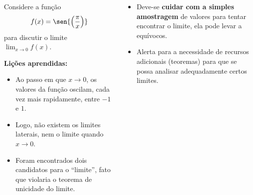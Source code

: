 \begin{frame}
  \begin{columns}[onlytextwidth]
    \begin{column}{0.49\textwidth}\vspace{-0.5cm}
      \begin{example}
        Considere a função
        \begin{equation*}
          f(x) = \sen{\left(\frac{\pi}{x}\right)}
        \end{equation*}
        para discutir o limite $\displaystyle\lim_{x\to 0}f(x)$.
      \end{example}
      \textbf{Lições aprendidas:}
      \begin{itemize}\small
        \item Ao passo em que $x\to 0$, os valores da função oscilam, cada vez mais rapidamente, entre $-1$ e $1$.
        \item Logo, não existem os limites laterais, nem o limite quando $x\to 0$.
        \item Foram encontrados dois candidatos para o ``limite'', fato que violaria o teorema de unicidade do limite.
      \end{itemize}
    \end{column}
    \begin{column}{0.49\textwidth}\vspace{-0.85cm}
      \begin{figure}
      \end{figure}
      \vspace{-0.1cm}
      \begin{itemize}\small
        \item Deve-se \textbf{cuidar com a simples amostragem} de valores para tentar encontrar o limite, ela pode levar a equívocos.
        \item Alerta para a necessidade de recursos adicionais (teoremas) para que se possa analisar adequadamente certos limites.
      \end{itemize}
    \end{column}
  \end{columns}
\end{frame}

